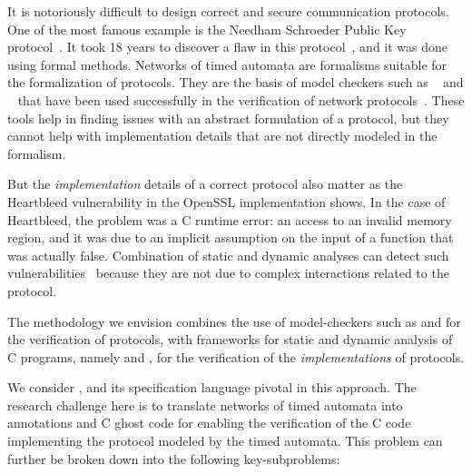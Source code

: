 It is notoriously difficult to design correct and secure communication protocols.
One of the most famous example is the Needham Schroeder Public Key protocol~\cite{NS1978:CACM}.
It took 18 years to discover a flaw in this protocol~\cite{LOW1996:TACAS}, and it was done using formal methods.
Networks of timed automata are formalisms suitable for the formalization of protocols.
They are the basis of model checkers such as \uppaal~\cite{DLL2015:STTT} and \prism~\cite{KNP2011:CAV} that have been used successfully in the verification of network protocols~\cite{ZBW2013:ENTCS,HMJ2006:MASCOTS,HSS2010:NFM,KPK2015:VECOS}.
These tools help in finding issues with an abstract formulation of a protocol, but they cannot help with implementation details that are not directly modeled in the formalism.

But the {\em implementation} details of a correct protocol also matter as the Heartbleed vulnerability in the OpenSSL implementation shows.
In the case of Heartbleed, the problem was a C runtime error: an access to an invalid memory region, and it was due to an implicit assumption on the input of a function that was actually false.
Combination of static and dynamic analyses can detect such vulnerabilities~\cite{KKP2015:HVC} because they are not due to complex interactions related to the protocol.

The methodology we envision combines the use of model-checkers such as \uppaal and \prism for the verification of protocols, with frameworks for static and dynamic analysis of C programs, namely \framac and \deepstate, for the verification of the {\em implementations} of protocols.

We consider \framac, and its specification language \acsl pivotal in this approach.
The research challenge here is to translate networks of timed automata into \acsl annotations and C ghost code for enabling the verification of the C code implementing the protocol modeled by the timed automata.
This problem can further be broken down into the following key-subproblems:

